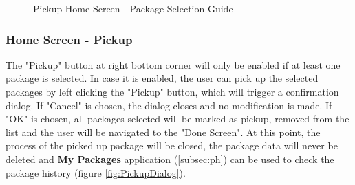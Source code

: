 \begin{figure}[H]
	\hspace{5pt}
	\caption{Pickup Home Screen - Package Selection Guide}
	\label{fig:PickupHomeScreen-2}
\end{figure}


\subsubsection{Home Screen - Pickup}
The "Pickup" button at right bottom corner will only be enabled if at least one package is selected. In case it is enabled, the user can pick up the selected packages by left clicking the "Pickup" button, which will trigger a confirmation dialog. If "Cancel" is chosen, the dialog closes and no modification is made. If "OK" is chosen, all packages selected will be marked as pickup, removed from the list and the user will be navigated to the "Done Screen". At this point, the process of the picked up package will be closed, the package data will never be deleted and \textbf{My Packages} application (\autoref{subsec:ph}) can be used to check the package history (figure \ref{fig:PickupDialog}).

